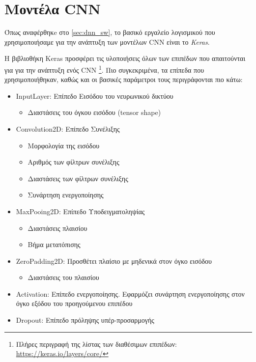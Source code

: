 \section{Μοντέλα CNN}
\label{sec:cnn_impl}

Όπως αναφέρθηκe στο \autoref{sec:dnn_sw}, το βασικό εργαλείο λογισμικού που
χρησιμοποιήσαμε για την ανάπτυξη των μοντέλων CNN είναι το \emph{Keras}.

Η βιβλιοθήκη Keras προσφέρει τις υλοποιήσεις όλων των επιπέδων που
απαιτούνται για για την ανάπτυξη ενός CNN
\footnote{Πλήρες περιγραφή της λίστας των διαθέσιμων επιπέδων: \href{https://keras.io/layers/core/}{https://keras.io/layers/core/}}.
Πιο συγκεκριμένα, τα επίπεδα που χρησιμοποιήθηκαν, καθώς και οι βασικές
παράμετροι τους περιγράφονται πιο κάτω:
\begin{itemize} %
  \item{InputLayer: Επίπεδο Εισόδου του νευρωνικού δικτύου}
    \begin{itemize}
      \item{Διαστάσεις του όγκου εισόδου (tensor shape)}
    \end{itemize}
  \item{Convolution2D: Επίπεδο Συνέλιξης}
    \begin{itemize}
      \item{Μορφολογία της εισόδου}
      \item{Αριθμός των φίλτρων συνέλιξης}
      \item{Διαστάσεις των φίλτρων συνέλιξης}
      \item{Συνάρτηση ενεργοποίησης}
    \end{itemize}
  \item{MaxPooing2D: Επίπεδο Υποδειγματοληψίας}
    \begin{itemize}
      \item{Διαστάσεις πλαισίου}
      \item{Βήμα μετατόπισης}
    \end{itemize}
  \item{ZeroPadding2D: Προσθέτει πλαίσιο με μηδενικά στον όγκο εισόδου}
    \begin{itemize}
      \item{Διαστάσεις του πλαισίου}
    \end{itemize}
  \item{Activation: Επίπεδο ενεργοποίησης. Εφαρμόζει συνάρτηση ενεργοποίησης στον
    όγκο εξόδου του προηγούμενου επιπέδου}
  \item{Dropout: Επίπεδο πρόληψης υπέρ-προσαρμογής \cite{lecun2015deep}}

\end{itemize}
